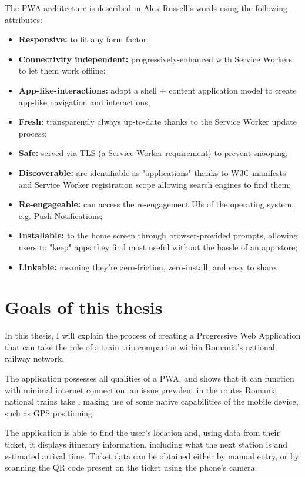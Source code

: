 The PWA architecture is described in Alex Russell's words using the following attributes: \cite{PWAShortHist}
\begin{itemize}
    \item \textbf{Responsive:} to fit any form factor;
    \item \textbf{Connectivity independent:} progressively-enhanced with Service Workers to let them work offline;
    \item \textbf{App-like-interactions:} adopt a shell + content application model to create app-like navigation and interactions;
    \item \textbf{Fresh:} transparently always up-to-date thanks to the Service Worker update process;
    \item \textbf{Safe:} served via TLS (a Service Worker requirement) to prevent snooping;
    \item \textbf{Discoverable:} are identifiable as "applications" thanks to W3C manifests and Service Worker registration scope allowing search engines to find them;
    \item \textbf{Re-engageable:} can access the re-engagement UIs of the operating system; e.g. Push Notifications;
    \item \textbf{Installable:} to the home screen through browser-provided prompts, allowing users to "keep" apps they find most useful without the hassle of an app store;
    \item \textbf{Linkable:} meaning they're zero-friction, zero-install, and easy to share.
\end{itemize}

\section{Goals of this thesis}

In this thesis, I will explain the process of creating a Progressive Web Application that can take the role of a train trip companion within Romania's national railway network.

The application possesses all qualities of a PWA, and shows that it can function with minimal internet connection, an issue prevalent in the routes Romania national trains take \cite{CFRInternetIC}, making use of some native capabilities of the mobile device, such as GPS positioning.

The application is able to find the user's location and, using data from their ticket, it displays itinerary information, including what the next station is and estimated arrival time. Ticket data can be obtained either by manual entry, or by scanning the QR code present on the ticket using the phone's camera.

